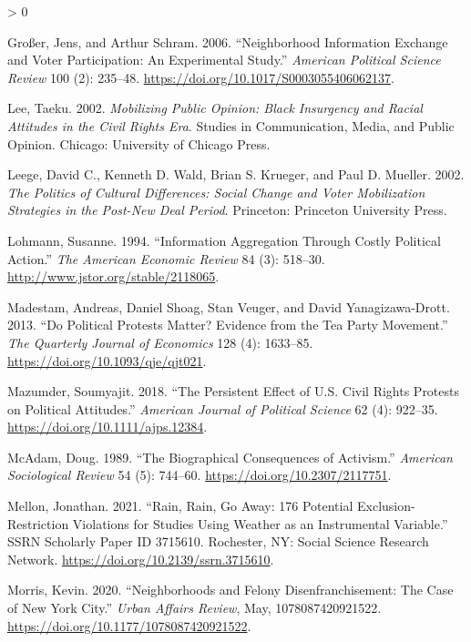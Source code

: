 \documentclass[
  12pt,
]{article}
\newlength{\cslhangindent}
\newenvironment{CSLReferences}[2] %
 {%
  \setlength{\parindent}{0pt}
  \ifodd #1 \everypar{\setlength{\hangindent}{\cslhangindent}}\ignorespaces\fi
  \ifnum #2 > 0
  \setlength{\parskip}{#2\baselineskip}
  \fi
 }%
 {}
\begin{document}
\begin{CSLReferences}{1}{0}
\leavevmode\hypertarget{ref-Grosser2006}{}%
Großer, Jens, and Arthur Schram. 2006. {``Neighborhood {Information Exchange} and {Voter Participation}: {An Experimental Study}.''} \emph{American Political Science Review} 100 (2): 235--48. \url{https://doi.org/10.1017/S0003055406062137}.

\leavevmode\hypertarget{ref-Lee2002}{}%
Lee, Taeku. 2002. \emph{Mobilizing Public Opinion: {Black} Insurgency and Racial Attitudes in the Civil Rights Era}. Studies in Communication, Media, and Public Opinion. {Chicago}: {University of Chicago Press}.

\leavevmode\hypertarget{ref-Leege2002}{}%
Leege, David C., Kenneth D. Wald, Brian S. Krueger, and Paul D. Mueller. 2002. \emph{The Politics of Cultural Differences: Social Change and Voter Mobilization Strategies in the Post-{New Deal} Period}. {Princeton}: {Princeton University Press}.

\leavevmode\hypertarget{ref-Lohmann1994}{}%
Lohmann, Susanne. 1994. {``Information {Aggregation Through Costly Political Action}.''} \emph{The American Economic Review} 84 (3): 518--30. \url{http://www.jstor.org/stable/2118065}.

\leavevmode\hypertarget{ref-Madestam2013}{}%
Madestam, Andreas, Daniel Shoag, Stan Veuger, and David Yanagizawa-Drott. 2013. {``Do {Political Protests Matter}? {Evidence} from the {Tea Party Movement}.''} \emph{The Quarterly Journal of Economics} 128 (4): 1633--85. \url{https://doi.org/10.1093/qje/qjt021}.

\leavevmode\hypertarget{ref-Mazumder2018}{}%
Mazumder, Soumyajit. 2018. {``The {Persistent Effect} of {U}.{S}. {Civil Rights Protests} on {Political Attitudes}.''} \emph{American Journal of Political Science} 62 (4): 922--35. \url{https://doi.org/10.1111/ajps.12384}.

\leavevmode\hypertarget{ref-McAdam1989}{}%
McAdam, Doug. 1989. {``The {Biographical Consequences} of {Activism}.''} \emph{American Sociological Review} 54 (5): 744--60. \url{https://doi.org/10.2307/2117751}.

\leavevmode\hypertarget{ref-Mellon2021}{}%
Mellon, Jonathan. 2021. {``Rain, {Rain}, {Go Away}: 176 {Potential Exclusion}-{Restriction Violations} for {Studies Using Weather} as an {Instrumental Variable}.''} SSRN Scholarly Paper ID 3715610. {Rochester, NY}: {Social Science Research Network}. \url{https://doi.org/10.2139/ssrn.3715610}.

\leavevmode\hypertarget{ref-Morris2020}{}%
Morris, Kevin. 2020. {``Neighborhoods and {Felony Disenfranchisement}: {The Case} of {New York City}.''} \emph{Urban Affairs Review}, May, 1078087420921522. \url{https://doi.org/10.1177/1078087420921522}.


\end{CSLReferences}
\end{document}
